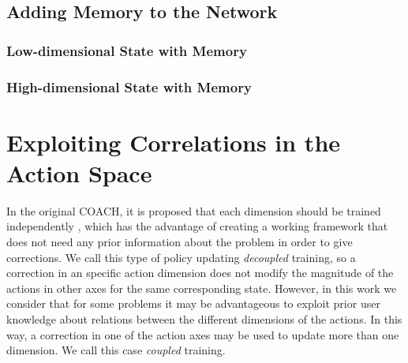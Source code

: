 \subsection{Adding Memory to the Network}
\subsubsection{Low-dimensional State with Memory}
\subsubsection{High-dimensional State with Memory}

\section{Exploiting Correlations in the Action Space}
In the original COACH, it is proposed that each dimension should be trained independently \cite{Celemin2017}, which has the advantage of creating a working framework that does not need any prior information about the problem in order to give corrections. We call this type of policy updating \emph{decoupled} training, so a correction in an specific action dimension does not modify the magnitude of the actions in other axes for the same corresponding state. However, in this work we consider that for some problems it may be advantageous to exploit prior user knowledge about relations between the different dimensions of the actions. In this way, a correction in one of the action axes may be used to update more than one dimension. We call this case \emph{coupled} training.